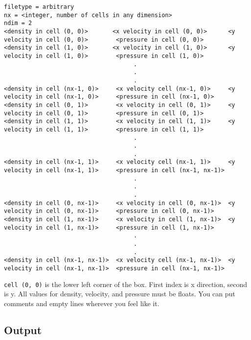 \begin{lstlisting}
filetype = arbitrary
nx = <integer, number of cells in any dimension>
ndim = 2
<density in cell (0, 0)>       <x velocity in cell (0, 0)>      <y velocity in cell (0, 0)>        <pressure in cell (0, 0)>
<density in cell (1, 0)>       <x velocity in cell (1, 0)>      <y velocity in cell (1, 0)>        <pressure in cell (1, 0)>
                                     .
                                     .
                                     .
<density in cell (nx-1, 0)>     <x velocity cell (nx-1, 0)>     <y velocity in cell (nx-1, 0)>     <pressure in cell (nx-1, 0)>
<density in cell (0, 1)>        <x velocity in cell (0, 1)>     <y velocity in cell (0, 1)>        <pressure in cell (0, 1)>
<density in cell (1, 1)>        <x velocity in cell (1, 1)>     <y velocity in cell (1, 1)>        <pressure in cell (1, 1)>
                                     .
                                     .
                                     .
<density in cell (nx-1, 1)>     <x velocity cell (nx-1, 1)>     <y velocity in cell (nx-1, 1)>     <pressure in cell (nx-1, nx-1)>
                                     .
                                     .
                                     .
<density in cell (0, nx-1)>     <x velocity in cell (0, nx-1)>  <y velocity in cell (0, nx-1)>     <pressure in cell (0, nx-1)>
<density in cell (1, nx-1)>     <x velocity in cell (1, nx-1)>  <y velocity in cell (1, nx-1)>     <pressure in cell (1, nx-1)>
                                     .
                                     .
                                     .
<density in cell (nx-1, nx-1)>  <x velocity cell (nx-1, nx-1)>  <y velocity in cell (nx-1, nx-1)>  <pressure in cell (nx-1, nx-1)>
\end{lstlisting}

\texttt{cell\ (0,\ 0)} is the lower left corner of the box. First index is x
direction, second is y. All values for density, velocity, and pressure must be
floats. You can put comments and empty lines wherever you feel like it.











\subsection{Output}

